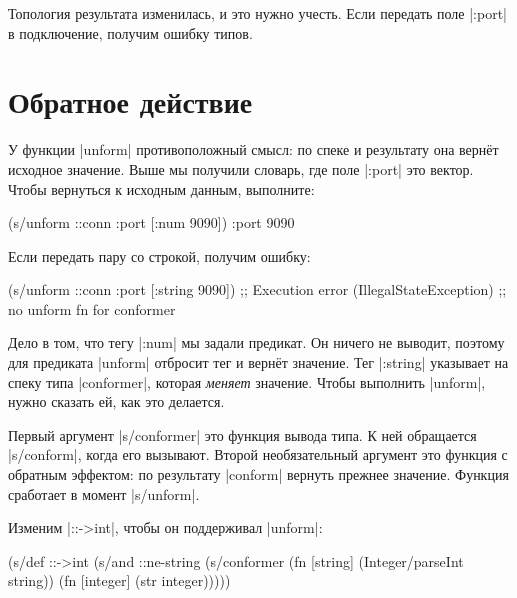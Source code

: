 Топология результата изменилась, и это нужно учесть. Если передать поле
\spverb|:port| в подключение, получим ошибку типов.

\section{Обратное действие}


У функции \spverb|unform| противоположный смысл: по спеке и результату она
верн\"{е}т исходное значение. Выше мы получили словарь, где поле \spverb|:port| это
вектор. Чтобы вернуться к исходным данным, выполните:

\begin{english}
  \begin{clojure}
(s/unform ::conn {:port [:num 9090]})
{:port 9090}
  \end{clojure}
\end{english}

\noindent
Если передать пару со строкой, получим ошибку:

\begin{english}
  \begin{clojure}
(s/unform ::conn {:port [:string 9090]})
;; Execution error (IllegalStateException)
;; no unform fn for conformer
  \end{clojure}
\end{english}

Дело в том, что тегу \spverb|:num| мы задали предикат. Он ничего не выводит,
поэтому для предиката \spverb|unform| отбросит тег и верн\"{е}т значение. Тег
\spverb|:string| указывает на спеку типа \spverb|conformer|, которая
\emph{меняет} значение. Чтобы выполнить \spverb|unform|, нужно сказать ей, как
это делается.



Первый аргумент \spverb|s/conformer| это функция вывода типа. К ней обращается
\spverb|s/conform|, когда его вызывают. Второй необязательный аргумент это
функция с обратным эффектом: по результату \spverb|conform| вернуть прежнее
значение. Функция сработает в момент \spverb|s/unform|.

Изменим \spverb|::->int|, чтобы он поддерживал \spverb|unform|:

\begin{english}
  \begin{clojure}
(s/def ::->int
  (s/and
   ::ne-string
   (s/conformer
    (fn [string]
      (Integer/parseInt string))
    (fn [integer]
      (str integer)))))
  \end{clojure}
\end{english}

